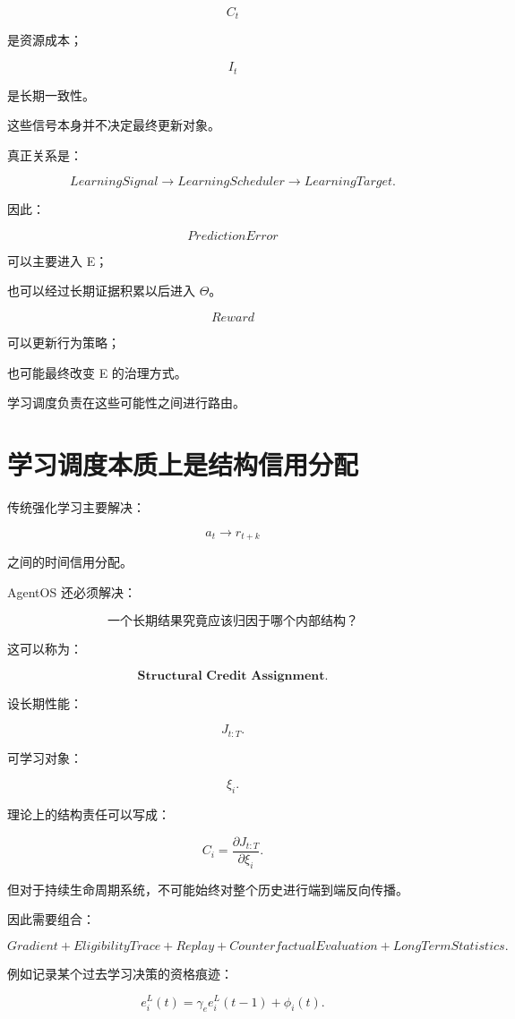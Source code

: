 \[
C_t
\]

是资源成本；

\[
I_t
\]

是长期一致性。

这些信号本身并不决定最终更新对象。

真正关系是：

\[
\boxed{
LearningSignal
\rightarrow
LearningScheduler
\rightarrow
LearningTarget.
}
\]

因此：

\[
\boxed{
PredictionError
}
\]

可以主要进入 E；

也可以经过长期证据积累以后进入 \(\Theta\)。

\[
\boxed{
Reward
}
\]

可以更新行为策略；

也可能最终改变 E 的治理方式。

学习调度负责在这些可能性之间进行路由。


\section{学习调度本质上是结构信用分配}

传统强化学习主要解决：

\[
a_t
\rightarrow
r_{t+k}
\]

之间的时间信用分配。

AgentOS 还必须解决：

\[
\boxed{
\text{一个长期结果究竟应该归因于哪个内部结构？}
}
\]

这可以称为：

\[
\boxed{
\textbf{Structural Credit Assignment}.
}
\]

设长期性能：

\[
J_{t:T}.
\]

可学习对象：

\[
\xi_i.
\]

理论上的结构责任可以写成：

\[
\boxed{
C_i
=
\frac{\partial J_{t:T}}
{\partial \xi_i}.
}
\]

但对于持续生命周期系统，不可能始终对整个历史进行端到端反向传播。

因此需要组合：

\[
\boxed{
Gradient
+
EligibilityTrace
+
Replay
+
CounterfactualEvaluation
+
LongTermStatistics.
}
\]

例如记录某个过去学习决策的资格痕迹：

\[
e_i^L(t)
=
\gamma_e e_i^L(t-1)
+
\phi_i(t).
\]

